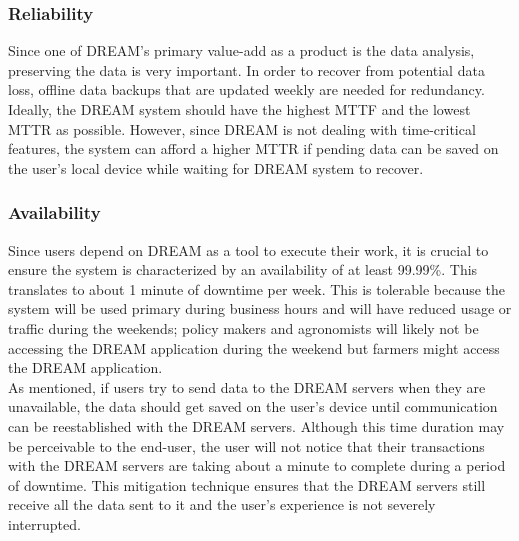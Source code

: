 \subsubsection{Reliability}
\begin{flushleft}
Since one of DREAM's primary value-add as a product is the data analysis, preserving the data is very important. In order to recover from potential data loss, offline data backups that are updated weekly are needed for redundancy. Ideally, the DREAM system should have the highest MTTF and the lowest MTTR as possible. However, since DREAM is not dealing with time-critical features, the system can afford a higher MTTR if pending data can be saved on the user's local device while waiting for DREAM system to recover.
\end{flushleft}

\subsubsection{Availability}
\begin{flushleft}

Since users depend on DREAM as a tool to execute their work, it is crucial to ensure the system is characterized by an availability of at least 99.99\%. This translates to about 1 minute of downtime per week. This is tolerable because the system will be used primary during business hours and will have reduced usage or traffic during the weekends; policy makers and agronomists will likely not be accessing the DREAM application during the weekend but farmers might access the DREAM application.\smallskip\\
As mentioned, if users try to send data to the DREAM servers when they are unavailable, the data should get saved on the user's device until communication can be reestablished with the DREAM servers. Although this time duration may be perceivable to the end-user, the user will not notice that their transactions with the DREAM servers are taking about a minute to complete during a period of downtime. This mitigation technique ensures that the DREAM servers still receive all the data sent to it and the user's experience is not severely interrupted.\\
\end{flushleft}

